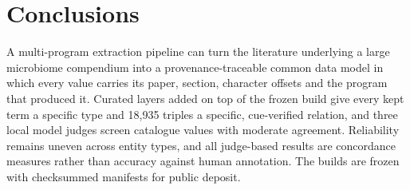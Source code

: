 \documentclass[referee,lineno,pdflatex,sn-vancouver-num]{sn-jnl}
\theoremstyle{thmstyleone}%
\theoremstyle{thmstyletwo}%
\theoremstyle{thmstylethree}%
\begin{document}

\section{Conclusions}\label{sec:conclusions}
A multi-program extraction pipeline can turn the literature underlying a
large microbiome compendium into a provenance-traceable common data model
in which every value carries its paper, section, character offsets and
the program that produced it. Curated layers added on top of the frozen
build give every kept term a specific type and 18,935 triples a specific,
cue-verified relation, and three local model judges screen catalogue
values with moderate agreement. Reliability remains uneven across entity
types, and all judge-based results are concordance measures rather than
accuracy against human annotation. The builds are frozen with checksummed
manifests for public deposit.

\backmatter
\end{document}
